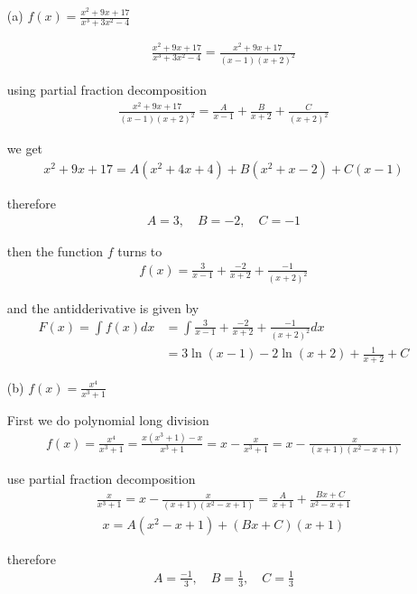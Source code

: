 \documentclass[11pt,a4paper]{article}
\begin{document}
\begin{enumerate}

\item[(a)]$f(x)=\frac{x^2+9x+17}{x^3+3x^2-4}$

\begin{align}
\frac{x^2+9x+17}{x^3+3x^2-4}=\frac{x^2+9x+17}{(x-1)(x+2)^2}
\end{align}

using partial fraction decomposition
\begin{align}
\frac{x^2+9x+17}{(x-1)(x+2)^2}=\frac{A}{x-1}+\frac{B}{x+2}+\frac{C}{(x+2)^2}
\end{align}

we get
\begin{align}
x^2+9x+17=A(x^2+4x+4)+B(x^2+x-2)+C(x-1)
\end{align}

therefore
\begin{align}
A=3,\hspace{1em}
B=-2,\hspace{1em}
C=-1
\end{align}

then the function $f$ turns to
\begin{align}
f(x)=\frac{3}{x-1}+\frac{-2}{x+2}+\frac{-1}{(x+2)^2}
\end{align}

and the antidderivative is given by
\begin{align}
F(x)=\int f(x)dx
&=\int \frac{3}{x-1}+\frac{-2}{x+2}+\frac{-1}{(x+2)^2}dx \\
&=3\ln(x-1)-2\ln(x+2)+\frac{1}{x+2}+C
\end{align}

\newpage

\item[(b)]$f(x)=\frac{x^4}{x^3+1}$

First we do polynomial long division
\begin{align}
f(x)=\frac{x^4}{x^3+1}=\frac{x(x^3+1)-x}{x^3+1}=x-\frac{x}{x^3+1}=x-\frac{x}{(x+1)(x^2-x+1)}
\end{align}

use partial fraction decomposition
\begin{align}
\frac{x}{x^3+1}=x-\frac{x}{(x+1)(x^2-x+1)}=\frac{A}{x+1}+\frac{Bx+C}{x^2-x+1}
\end{align}
\begin{align}
x=A(x^2-x+1)+(Bx+C)(x+1)
\end{align}

therefore
\begin{align}
A=\frac{-1}{3},\hspace{1em}
B=\frac{1}{3},\hspace{1em}
C=\frac{1}{3}
\end{align}


\end{enumerate}
\end{document}
